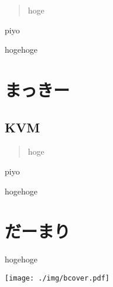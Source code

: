 \documentclass[9pt,b5paper,tombo]{jsbook}
\begin{document}
\begin{quote}
hoge
\end{quote}

\begin{flushright}
piyo
\end{flushright}

hogehoge

\section{まっきー}

\subsection{KVM}

\begin{quote}
hoge
\end{quote}

\begin{flushright}
piyo
\end{flushright}

hogehoge

\section{だーまり}

hogehoge

\newpage


\enlargethispage{\paperwidth}
\thispagestyle{empty}
\vspace*{-1truein}
\vspace*{-\topmargin}
\vspace*{-\headheight}
\vspace*{-\headsep}
\vspace*{-\topskip}
\noindent\hspace*{-1in}\hspace*{-\oddsidemargin}
\texttt{[image: ./img/bcover.pdf]}
\end{document}
